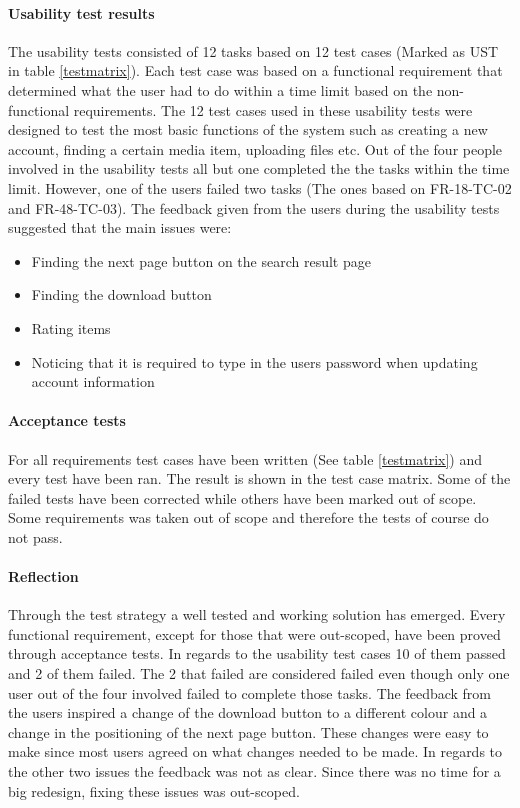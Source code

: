 \documentclass[../report.tex]{subfiles}
\begin{document}
\paragraph{Usability test results}
The usability tests consisted of 12 tasks based on 12 test cases (Marked as UST in table \ref{testmatrix}). Each test case was based on a functional requirement that determined what the user had to do within a time limit based on the non-functional requirements. The 12 test cases used in these usability tests were designed to test the most basic functions of the system such as creating a new account, finding a certain media item, uploading files etc. 
Out of the four people involved in the usability tests all but one completed the the tasks within the time limit. However, one of the users failed two tasks (The ones based on FR-18-TC-02 and FR-48-TC-03). The feedback given from the users during the usability tests suggested that the main issues were:
\begin{itemize}
\item Finding the next page button on the search result page
\item Finding the download button
\item Rating items
\item Noticing that it is required to type in the users password when updating account information
\end{itemize} 

\paragraph{Acceptance tests}
For all requirements test cases have been written (See table \ref{testmatrix}) and every test have been ran. The result is shown in the test case matrix. Some of the failed tests have been corrected while others have been marked out of scope. Some requirements was taken out of scope and therefore the tests of course do not pass.

\paragraph{Reflection}

Through the test strategy a well tested and working solution has emerged. Every functional requirement, except for those that were out-scoped, have been proved through acceptance tests.
In regards to the usability test cases 10 of them passed and 2 of them failed. The 2 that failed are considered failed even though only one user out of the four involved failed to complete those tasks. The feedback from the users inspired a change of the download button to a different colour and a change in the positioning of the next page button. These changes were easy to make since most users agreed on what changes needed to be made. In regards to the other two issues the feedback was not as clear. Since there was no time for a big redesign, fixing these issues was out-scoped.
\end{document}

